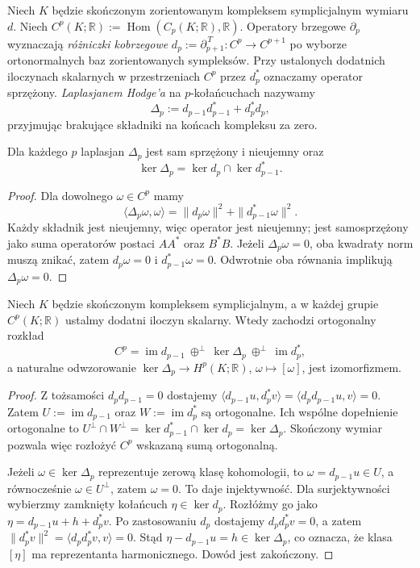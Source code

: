 \begin{definicja}
Niech $K$ będzie skończonym zorientowanym
kompleksem symplicjalnym wymiaru $d$. Niech
$C^p(K;\mathbb R):=\operatorname{Hom}(C_p(K;\mathbb R),\mathbb R)$.
Operatory brzegowe $\partial_p$ wyznaczają
\emph{różniczki kobrzegowe}
$d_p:=\partial_{p+1}^{\,T}:C^p\to C^{p+1}$
po wyborze ortonormalnych baz zorientowanych sympleksów.
Przy ustalonych dodatnich iloczynach skalarnych
w przestrzeniach $C^p$ przez $d_p^*$ oznaczamy
operator sprzężony. \emph{Laplasjanem Hodge'a}
na $p$-kołańcuchach nazywamy
\[
\Delta_p:=d_{p-1}d_{p-1}^*+d_p^*d_p,
\]
przyjmując brakujące składniki na końcach
kompleksu za zero.
\end{definicja}

\begin{stwierdzenie}
Dla każdego $p$ laplasjan $\Delta_p$ jest
sam sprzężony i nieujemny oraz
\[
\ker\Delta_p=\ker d_p\cap\ker d_{p-1}^*.
\]
\end{stwierdzenie}

\begin{proof}
Dla dowolnego $\omega\in C^p$ mamy
\[
\langle\Delta_p\omega,\omega\rangle
=\|d_p\omega\|^2+\|d_{p-1}^*\omega\|^2.
\]
Każdy składnik jest nieujemny, więc operator jest
nieujemny; jest samosprzężony jako suma operatorów
postaci $AA^*$ oraz $B^*B$. Jeżeli $\Delta_p\omega=0$,
oba kwadraty norm muszą znikać, zatem
$d_p\omega=0$ i $d_{p-1}^*\omega=0$.
Odwrotnie oba równania implikują
$\Delta_p\omega=0$.
\end{proof}

\begin{twierdzenie}
\label{thm:tg-finite-hodge}
Niech $K$ będzie skończonym kompleksem symplicjalnym,
a w każdej grupie $C^p(K;\mathbb R)$ ustalmy dodatni
iloczyn skalarny. Wtedy zachodzi ortogonalny rozkład
\[
C^p=\operatorname{im}d_{p-1}
\ \oplus^{\perp}\ \ker\Delta_p
\ \oplus^{\perp}\ \operatorname{im}d_p^*,
\]
a naturalne odwzorowanie
$\ker\Delta_p\to H^p(K;\mathbb R)$,
$\omega\mapsto[\omega]$, jest izomorfizmem.
\end{twierdzenie}

\begin{proof}
Z tożsamości $d_pd_{p-1}=0$ dostajemy
$\langle d_{p-1}u,d_p^*v\rangle
=\langle d_pd_{p-1}u,v\rangle=0$.
Zatem $U:=\operatorname{im}d_{p-1}$ oraz
$W:=\operatorname{im}d_p^*$ są ortogonalne.
Ich wspólne dopełnienie ortogonalne to
$U^\perp\cap W^\perp
=\ker d_{p-1}^*\cap\ker d_p=\ker\Delta_p$.
Skończony wymiar pozwala więc rozłożyć $C^p$
wskazaną sumą ortogonalną.

Jeżeli $\omega\in\ker\Delta_p$ reprezentuje zerową
klasę kohomologii, to $\omega=d_{p-1}u\in U$,
a równocześnie $\omega\in U^\perp$, zatem $\omega=0$.
To daje injektywność. Dla surjektywności wybierzmy
zamknięty kołańcuch $\eta\in\ker d_p$. Rozłóżmy go
jako $\eta=d_{p-1}u+h+d_p^*v$.
Po zastosowaniu $d_p$ dostajemy $d_pd_p^*v=0$,
a zatem $\|d_p^*v\|^2
=\langle d_pd_p^*v,v\rangle=0$.
Stąd $\eta-d_{p-1}u=h\in\ker\Delta_p$,
co oznacza, że klasa $[\eta]$ ma reprezentanta
harmonicznego. Dowód jest zakończony.
\end{proof}

